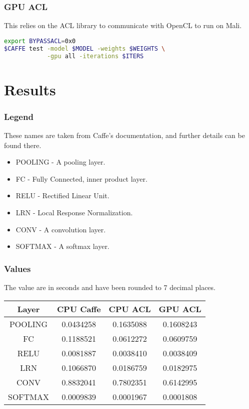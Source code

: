 \documentclass[12pt, a4paper, notitlepage]{report}
\begin{document}
\subsubsection*{GPU ACL}
This relies on the ACL library to communicate with OpenCL to run on Mali.\cite{acl}
\begin{lstlisting}[language=bash]
export BYPASSACL=0x0
$CAFFE test -model $MODEL -weights $WEIGHTS \
            -gpu all -iterations $ITERS
\end{lstlisting}

\section*{Results}
\subsubsection*{Legend}
These names are taken from Caffe's documentation, and further details can be found there.\cite{caffe}
\begin{itemize}
	\item POOLING - A pooling layer.
	\item FC - Fully Connected, inner product layer.
	\item RELU - Rectified Linear Unit.
	\item LRN - Local Response Normalization.
	\item CONV - A convolution layer.
	\item SOFTMAX - A softmax layer.
\end{itemize}

\subsubsection*{Values}
The value are in seconds and have been rounded to 7 decimal places.
\begin{center}
\begin{tabular}{ | c | c | c | c |}
\hline
Layer & CPU Caffe & CPU ACL & GPU ACL \\
\hline
POOLING & 0.0434258 & 0.1635088 & 0.1608243 \\
\hline
FC & 0.1188521 & 0.0612272 & 0.0609759 \\
\hline
RELU & 0.0081887 & 0.0038410 & 0.0038409 \\
\hline
LRN & 0.1066870 & 0.0186759 & 0.0182975 \\
\hline
CONV & 0.8832041 & 0.7802351 & 0.6142995 \\
\hline
SOFTMAX & 0.0009839 & 0.0001967 & 0.0001808 \\
\hline
\end{tabular}
\end{center}
\end{document}
